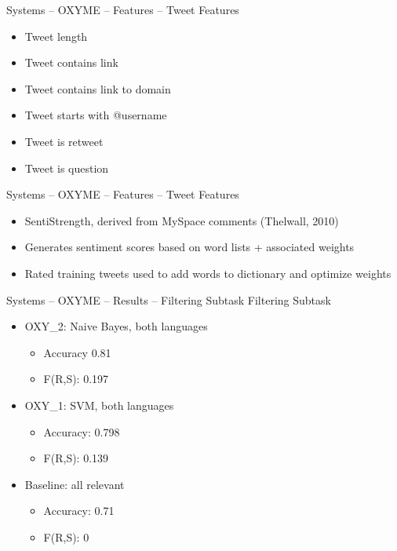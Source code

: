 \documentclass[12pt,a4paper]{beamer}
\begin{document}
\begin{frame}{Systems -- OXYME -- Features -- Tweet Features}
\begin{itemize}
\item Tweet length
\item Tweet contains link
\item Tweet contains link to domain
\item Tweet starts with @username
\item Tweet is retweet
\item Tweet is question
\end{itemize}

\end{frame}


\begin{frame}{Systems -- OXYME -- Features -- Tweet Features}
\begin{itemize}
\item SentiStrength, derived from MySpace comments (Thelwall, 2010)
\item Generates sentiment scores based on word lists + associated weights
\item Rated training tweets used to add words to dictionary and optimize weights
\end{itemize}

\end{frame}

\begin{frame}{Systems -- OXYME -- Results -- Filtering Subtask}
Filtering Subtask
\begin{itemize}
\item OXY\_2: Naive Bayes, both languages
  \begin{itemize}
  \item Accuracy 0.81
  \item F(R,S): 0.197
  \end{itemize}
\item OXY\_1: SVM, both languages
  \begin{itemize}
  \item Accuracy: 0.798
  \item F(R,S): 0.139
  \end{itemize}
\item Baseline: all relevant
  \begin{itemize}
  \item Accuracy: 0.71
  \item F(R,S): 0
  \end{itemize}
\end{itemize}

\end{frame}
\end{document}

